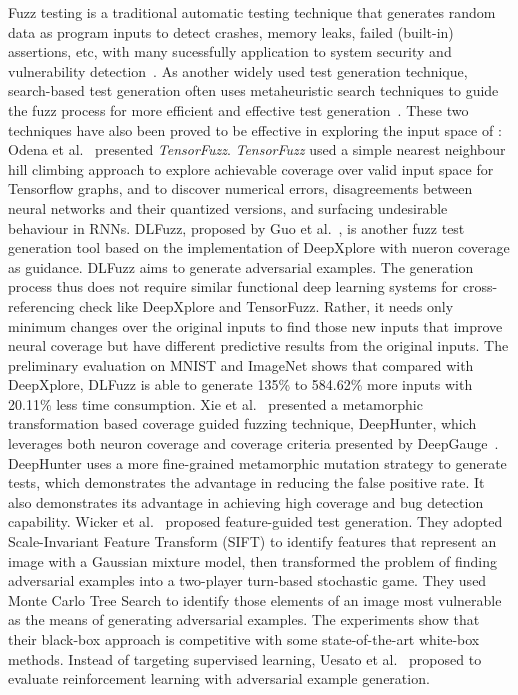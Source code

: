 Fuzz testing is a traditional automatic testing technique that generates random data as program inputs to detect crashes, memory leaks, failed (built-in) assertions, etc, with many sucessfully application to system security and vulnerability detection~.
As another widely used test generation technique, search-based test generation often uses metaheuristic search techniques to guide the fuzz process for more efficient and effective test generation~.
These two techniques have also been proved to be effective in exploring the input space of \mlt{}:
Odena et al.~ presented \emph{TensorFuzz}.
\emph{TensorFuzz} used a simple nearest neighbour hill climbing approach to explore achievable coverage over valid input space for Tensorflow graphs, and to discover numerical errors, disagreements between neural networks and their quantized versions, and surfacing undesirable behaviour in RNNs.
DLFuzz, proposed by Guo et al.~, is another fuzz test generation tool based on the implementation of DeepXplore with nueron coverage as guidance.
DLFuzz aims to generate adversarial examples.
The generation process thus does not require similar functional deep learning systems for
cross-referencing check like DeepXplore and TensorFuzz.
Rather, it needs only minimum changes over the original inputs to find those new inputs that improve neural coverage but have different predictive results from the original inputs.
The preliminary evaluation on MNIST and ImageNet shows that compared with DeepXplore, DLFuzz is able to generate 135\% to 584.62\% more inputs with 20.11\% less time consumption.
Xie et al.~ presented a metamorphic transformation based coverage guided fuzzing technique, DeepHunter, which leverages both neuron coverage and coverage criteria  presented by DeepGauge~.
DeepHunter uses a more fine-grained metamorphic mutation strategy to generate tests, which demonstrates the advantage in reducing the false positive rate. It also demonstrates its advantage in achieving high coverage and bug detection capability. 
Wicker et al.~ proposed feature-guided test generation.
They adopted Scale-Invariant Feature Transform (SIFT) to identify features that represent an image with a Gaussian mixture model, then transformed the problem of finding adversarial examples into a two-player turn-based stochastic game.
They used Monte Carlo Tree Search to identify those elements of an image most vulnerable as the means of generating adversarial examples.
The experiments show that their black-box approach is competitive with some state-of-the-art white-box methods.
Instead of targeting supervised learning, Uesato et al.~ proposed to evaluate reinforcement learning with adversarial example generation.

